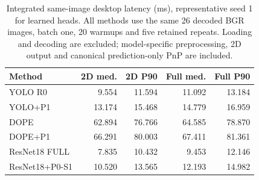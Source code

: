 \begin{table}[t]\centering\small
\caption{Integrated same-image desktop latency (ms), representative seed 1 for learned heads. All methods use the same 26 decoded BGR images, batch one, 20 warmups and five retained repeats. Loading and decoding are excluded; model-specific preprocessing, 2D output and canonical prediction-only PnP are included.}\label{tab:runtime}
\begin{tabular}{lrrrr}\toprule
Method & 2D med. & 2D P90 & Full med. & Full P90\\\midrule
YOLO R0 & 9.554 & 11.594 & 11.092 & 13.184\\
YOLO+P1 & 13.174 & 15.468 & 14.779 & 16.959\\
DOPE & 62.894 & 76.766 & 64.585 & 78.870\\
DOPE+P1 & 66.291 & 80.003 & 67.411 & 81.361\\
ResNet18 FULL & 7.835 & 10.432 & 9.453 & 12.146\\
ResNet18+P0-S1 & 10.520 & 13.565 & 12.193 & 14.982\\
\bottomrule\end{tabular}
\end{table}

